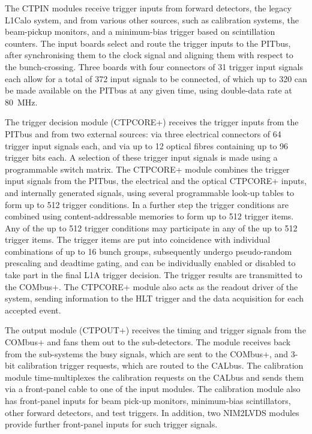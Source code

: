 \documentclass[cernpreprint, atlasdraft=false, UKenglish,british,orcidlogo, texmf, orcidlogo]{atlasdoc}
\begin{document}
The \gls{CTPIN} modules receive trigger inputs from forward detectors, the legacy \gls{L1Calo} system, and from various other sources, such as calibration systems, the beam-pickup monitors, and a minimum-bias trigger based on scintillation counters.  The input boards select and route the trigger inputs to the \gls{PITbus}, after synchronising them to the clock signal and aligning them with respect to the bunch-crossing.  Three boards with four connectors of 31 trigger input signals each allow for a total of 372 input signals to be connected, of which up to 320 can be made available on the \gls{PITbus} at any given time, using double-data rate at \SI{80}{\MHz}.
 
The trigger decision module (\gls{CTPCORE+}) receives the trigger inputs from the \gls{PITbus} and from two external sources: via three electrical connectors of 64 trigger input signals each, and via up to 12 optical fibres containing up to 96 trigger bits each.  A selection of these trigger input signals is made using a programmable switch matrix.  The \gls{CTPCORE+} module combines the trigger input signals from the \gls{PITbus}, the electrical and the optical \gls{CTPCORE+} inputs, and internally generated signals, using several programmable look-up tables to form up to 512 trigger conditions.  In a further step the trigger conditions are combined using content-addressable memories to form up to 512 trigger items.  Any of the up to 512 trigger conditions may participate in any of the up to 512 trigger items.  The trigger items are put into coincidence with individual combinations of up to 16 bunch groups, subsequently undergo pseudo-random prescaling and deadtime gating, and can be individually enabled or disabled to take part in the final \gls{L1A} trigger decision.  The trigger results are transmitted to the \gls{COMbus+}.  The \gls{CTPCORE+} module also acts as the readout driver of the system, sending information to the \gls{HLT} trigger and the data acquisition for each accepted event.
 
The output module (\gls{CTPOUT+}) receives the timing and trigger signals from the \gls{COMbus+} and fans them out to the sub-detectors.  The module receives back from the sub-systems the busy signals, which are sent to the \gls{COMbus+}, and 3-bit calibration trigger requests, which are routed to the \gls{CALbus}.  The calibration module time-multiplexes the calibration requests on the \gls{CALbus} and sends them via a front-panel cable to one of the input modules.  The calibration module also has front-panel inputs for beam pick-up monitors, minimum-bias scintillators, other forward detectors, and test triggers.  In addition, two \gls{NIM2LVDS} modules provide further front-panel inputs for such trigger signals.
 
\end{document}
